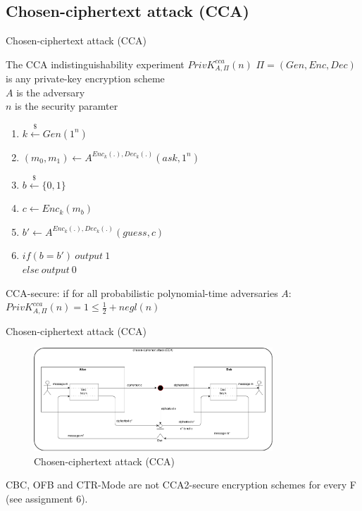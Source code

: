 \documentclass[ucs,9pt]{beamer}
\begin{document}
\subsection{Chosen-ciphertext attack (CCA)}
\begin{frame}{Chosen-ciphertext attack (CCA)}
    \begin{block}{The CCA indistinguishability experiment $ PrivK_{A,\Pi}^{cca}(n) $}
        $\Pi = (Gen, Enc, Dec)$ is any private-key encryption scheme\\
        $A$ is the adversary\\
        $n$ is the security paramter\\
        \begin{enumerate}
            \item $k \overset{\$}{\leftarrow} Gen(1^n)$
            \item $(m_{0},m_{1}) \leftarrow A^{Enc_{k}(.), Dec_{k}(.)}(ask, 1^{n})$
            \item $b \overset{\$}{\leftarrow} \{0, 1\}$
            \item $c \leftarrow Enc_{k}(m_{b})$
            \item $b' \leftarrow A^{Enc_{k}(.), Dec_{k}(.)}(guess, c)$
            \item $if(b = b')\ output\ 1$ \\
            $else\ output\ 0$
        \end{enumerate}
        CCA-secure: if for all probabilistic polynomial-time adversaries $A$:\\
        $ PrivK_{A,\Pi}^{cca}(n) = 1 \leq \frac{1}{2} + negl(n) $
    \end{block}
\end{frame}

\begin{frame}{Chosen-ciphertext attack (CCA)}
    
    \begin{figure}[h]
        \centering
        \includegraphics[width=0.8\textwidth]{figures/CCA.png}
        \caption{Chosen-ciphertext attack (CCA)}
    \end{figure}
    CBC, OFB and CTR-Mode are not CCA2-secure encryption schemes for every F (see assignment 6).
\end{frame}
\end{document}
